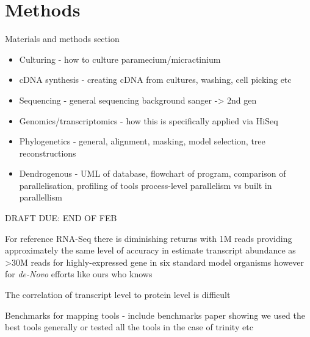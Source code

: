 \graphicspath{{chapters/2.Methods/figures}}

\chapter{Methods}

Materials and methods section

\begin{itemize}
    \item Culturing - how to culture paramecium/micractinium
    \item cDNA synthesis - creating cDNA from cultures, washing, cell picking etc
    \item Sequencing - general sequencing background sanger -> 2nd gen
    \item Genomics/transcriptomics - how this is specifically applied via HiSeq
    \item Phylogenetics - general, alignment, masking, model selection, tree reconstructions 
    \item Dendrogenous - UML of database, flowchart of program, comparison of parallelisation, profiling of tools process-level parallelism vs built in parallellism
\end{itemize}

%
%
%
%
%
%

DRAFT DUE: END OF FEB



 
For reference RNA-Seq there is diminishing returns with 1M reads providing approximately the same level of accuracy in estimate transcript abundance as >30M reads for highly-expressed gene in six standard model organisms \citep{Lei2014} however for \textit{de-Novo} efforts like ours who knows



The correlation of transcript level to protein level is difficult


Benchmarks for mapping tools - include benchmarks paper showing we used the best tools generally or tested all the tools in the case of trinity etc
